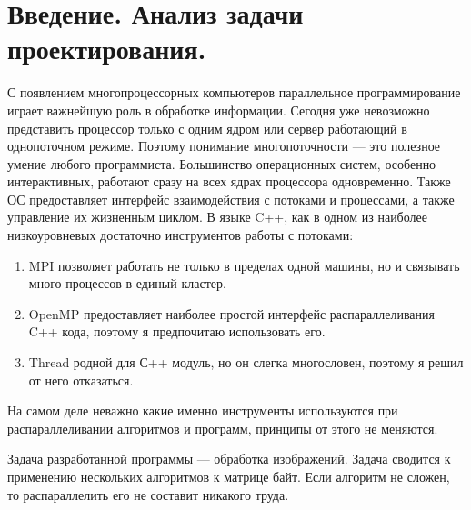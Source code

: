 \newpage


\section*{Введение. Анализ задачи проектирования.}
С появлением многопроцессорных компьютеров параллельное программирование играет важнейшую роль в обработке информации.
Сегодня уже невозможно представить процессор только с одним ядром или сервер работающий в однопоточном режиме.
Поэтому понимание многопоточности --- это полезное умение любого программиста.
Большинство операционных систем, особенно интерактивных, работают сразу на всех ядрах процессора одновременно.
Также ОС предоставляет интерфейс взаимодействия с потоками и процессами, а также управление их жизненным циклом.
В языке C++, как в одном из наиболее низкоуровневых достаточно инструментов работы с потоками:
\begin{enumerate}
    \item MPI позволяет работать не только в пределах одной машины, но и связывать много процессов в единый кластер.
    \item OpenMP предоставляет наиболее простой интерфейс распараллеливания C++ кода, поэтому я предпочитаю использовать его.
    \item Thread родной для С++ модуль, но он слегка многословен, поэтому я решил от него отказаться.{}
\end{enumerate}
На самом деле неважно какие именно инструменты используются при распараллеливании алгоритмов и программ, принципы от этого не меняются.

Задача разработанной программы --- обработка изображений.
Задача сводится к применению нескольких алгоритмов к матрице байт.
Если алгоритм не сложен, то распараллелить его не составит никакого труда.